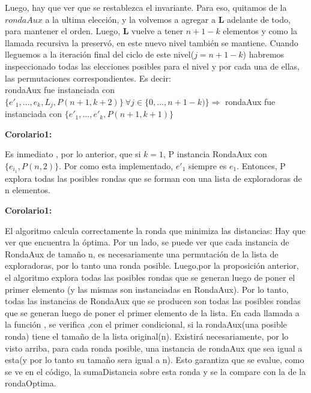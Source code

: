 \documentclass[10pt, a4paper]{article}
\begin{document}
Luego, hay que ver que se restablezca el invariante. Para eso, quitamos de la $rondaAux$ a la ultima elección, y la volvemos a agregar a \textbf{L} adelante de todo, para mantener el orden. Luego, \textbf{L} vuelve a tener $n+1-k$ elementos y como la llamada recursiva la preservó, en este nuevo nivel también se mantiene.
Cuando lleguemos a la iteración final del ciclo de este nivel($j = n+1-k$) habremos inspeccionado todas las elecciones posibles para el nivel y por cada una de ellas, las permutaciones correspondientes. Es decir:\\

rondaAux fue instanciada con $\{e'_{1},..., e_{k},L_{j},P(n+1,k+2)\} \ \forall j \in \{0,...,n+1-k) \} \Rightarrow$  rondaAux fue instanciada con $\{e'_{1},..., e'_{k},P(n+1,k+1)\} $ \\


\begin{flushleft}
\textbf{Corolario1:}\\
\end{flushleft}
Es inmediato , por lo anterior, que  si $k=1$, P  instancia RondaAux con $\{e_{i_1},P(n,2)\}$. Por como esta implementado, $e'_{1}$ siempre es $e_{1}$. Entonces, P explora todas las posibles rondas que se forman con una lista de exploradoras de n elementos.\\


\begin{flushleft}
\textbf{Corolario1:}\\
\end{flushleft}
El algoritmo calcula correctamente la ronda que minimiza las distancias:
Hay que ver que encuentra la óptima.
Por un lado, se puede ver que cada instancia de RondaAux de tamaño n,  es necesariamente una permutación de la lista de exploradoras, por lo tanto una ronda posible. 
Luego,por la proposición anterior, el algoritmo explora todas las posibles rondas que se generan luego de poner el primer elemento (y las mismas son instanciadas en RondaAux).
Por lo tanto, todas las instancias de RondaAux que se producen son todas las posibles rondas que se generan luego de poner el primer elemento de la lista.
En cada llamada a la función , se verifica ,con el primer condicional, si la rondaAux(una posible ronda) tiene el tamaño de la lista original(n). Existirá necesariamente, por lo visto arriba,  para cada ronda posible, una instancia de rondaAux que sea igual a esta(y por lo tanto su tamaño sera igual a n). Esto garantiza que se evalue, como se ve en el código, la sumaDistancia sobre esta ronda y se la compare con la de la  rondaOptima.\\
\end{document}

